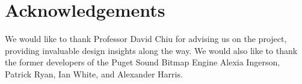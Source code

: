 \section{Acknowledgements}
We would like to thank Professor David Chiu for advising us on the project,
providing invaluable design insights along the way.
We would also like to thank the former developers of the Puget Sound Bitmap
Engine Alexia Ingerson, Patrick Ryan, Ian White, and Alexander Harris.
